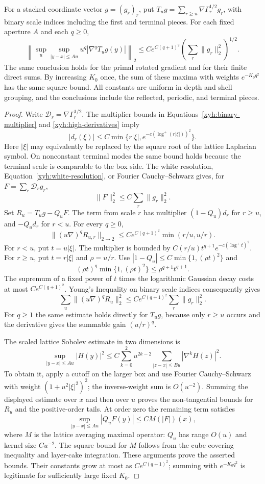 \begin{lemma}\label{xyh:maximal}
For a stacked coordinate vector $g=(g_r)_r$, put
$T_u g=\sum_{r\ge u}\nabla\Gamma_r^{1/2}g_r$, with binary scale
indices including the first and terminal pieces. For each fixed
aperture $A$ and each $q\ge0$,
\[
 \left\|\sup_u\sup_{|y-x|\le Au}
 u^q|\nabla^qT_ug(y)|\right\|_2
 \le Ce^{C(q+1)^2}
       \left(\sum_r\|g_r\|_2^2\right)^{1/2}.
\]
The same conclusion holds for the primal rotated gradient and for
their finite direct sums. By increasing $K_0$ once, the sum of these
maxima with weights $e^{-K_0q^2}$ has the same square bound.
All constants are uniform in depth and shell grouping, and the
conclusions include the reflected, periodic, and terminal pieces.
\end{lemma}
\begin{proof}
Write $\mathcal D_r=\nabla\Gamma_r^{1/2}$. The multiplier bounds in
Equations~\eqref{xyh:binary-multiplier} and
\eqref{xyh:high-derivatives} imply
\[
 |d_r(\xi)|\le C\min\{r|\xi|,
 e^{-c(\log^+(r|\xi|))^2}\}.
\]
Here $|\xi|$ may equivalently be replaced by the square root of the
lattice Laplacian symbol. On nonconstant terminal modes the same
bound holds because the terminal scale is comparable to the box
side. The white resolution, Equation~\eqref{xyh:white-resolution},
or Fourier Cauchy--Schwarz gives, for $F=\sum_r\mathcal D_rg_r$,
\[
 \|F\|_2^2\le C\sum_r\|g_r\|_2^2.
\]
Set $R_u=T_ug-Q_uF$. The term from scale $r$ has multiplier
$(1-Q_u)d_r$ for $r\ge u$, and $-Q_ud_r$ for $r<u$.
For every $q\ge0$,
\[
 \|(u\nabla)^qR_{u,r}\|_{2\to2}
 \le Ce^{C(q+1)^2}\min(r/u,u/r).
\]
For $r<u$, put $t=u|\xi|$. The multiplier is bounded by
$C(r/u)t^{q+1}e^{-c(\log^+t)^2}$. For $r\ge u$, put
$t=r|\xi|$ and $\rho=u/r$. Use
$|1-Q_u|\le C\min\{1,(\rho t)^2\}$ and
\[
 (\rho t)^q\min\{1,(\rho t)^2\}
 \le\rho^{q+1}t^{q+1}.
\]
The supremum of a fixed power of $t$ times the logarithmic Gaussian
decay costs at most $Ce^{C(q+1)^2}$. Young's Inequality on binary
scale indices consequently gives
\[
 \sum_u\|(u\nabla)^qR_u\|_2^2
 \le Ce^{C(q+1)^2}\sum_r\|g_r\|_2^2.
\]
For $q\ge1$ the same estimate holds directly for $T_ug$, because
only $r\ge u$ occurs and the derivative gives the summable gain
$(u/r)^q$.

The scaled lattice Sobolev estimate in two dimensions is
\[
 \sup_{|y-x|\le Au}|H(y)|^2
 \le C\sum_{k=0}^2u^{2k-2}
             \sum_{|z-x|\le Bu}|\nabla^kH(z)|^2.
\]
To obtain it, apply a cutoff on the larger box and use Fourier
Cauchy--Schwarz with weight $(1+u^2|\xi|^2)^2$; the inverse-weight
sum is $O(u^{-2})$. Summing the displayed estimate over $x$ and
then over $u$ proves the non-tangential bounds for $R_u$ and the
positive-order tails. At order zero the remaining term satisfies
\[
 \sup_{|y-x|\le Au}|Q_uF(y)|\le C M(|F|)(x),
\]
where $M$ is the lattice averaging maximal operator: $Q_u$ has
range $O(u)$ and kernel size $Cu^{-2}$. The square bound for $M$
follows from the cube covering inequality and layer-cake integration.
These arguments prove the asserted bounds. Their constants grow
at most as $Ce^{C(q+1)^2}$; summing with $e^{-K_0q^2}$ is legitimate
for sufficiently large fixed $K_0$.


\end{proof}
